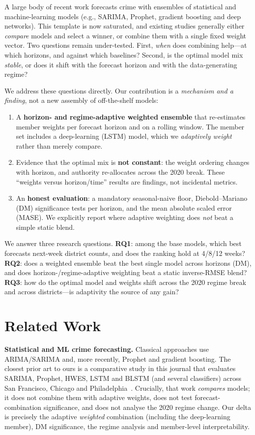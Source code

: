 \documentclass[11pt]{article}
\begin{document}
A large body of recent work forecasts crime with ensembles of statistical and machine-learning
models (e.g., SARIMA, Prophet, gradient boosting and deep networks). This template is now
saturated, and existing studies generally either \emph{compare} models and select a winner, or
combine them with a single fixed weight vector. Two questions remain under-tested. First,
\emph{when} does combining help---at which horizons, and against which baselines? Second, is the
optimal model mix \emph{stable}, or does it shift with the forecast horizon and with the
data-generating regime?

We address these questions directly. Our contribution is a \emph{mechanism and a finding}, not a
new assembly of off-the-shelf models:
\begin{enumerate}
  \item A \textbf{horizon- and regime-adaptive weighted ensemble} that re-estimates member
  weights per forecast horizon and on a rolling window. The member set includes a deep-learning
  (LSTM) model, which we \emph{adaptively weight} rather than merely compare.
  \item Evidence that the optimal mix is \textbf{not constant}: the weight ordering changes with
  horizon, and authority re-allocates across the 2020 break. These ``weights versus horizon/time''
  results are findings, not incidental metrics.
  \item An \textbf{honest evaluation}: a mandatory seasonal-naive floor, Diebold--Mariano (DM)
  significance tests per horizon, and the mean absolute scaled error (MASE). We explicitly report
  where adaptive weighting does \emph{not} beat a simple static blend.
\end{enumerate}

We answer three research questions. \textbf{RQ1}: among the base models, which best forecasts
next-week district counts, and does the ranking hold at 4/8/12 weeks? \textbf{RQ2}: does a
weighted ensemble beat the best single model across horizons (DM), and does horizon-/regime-adaptive
weighting beat a static inverse-RMSE blend? \textbf{RQ3}: how do the optimal model and weights shift
across the 2020 regime break and across districts---is adaptivity the source of any gain?

\section{Related Work}
\textbf{Statistical and ML crime forecasting.} Classical approaches use ARIMA/SARIMA and, more
recently, Prophet and gradient boosting. The closest prior art to ours is a comparative study in
this journal that evaluates SARIMA, Prophet, HWES, LSTM and BLSTM (and several classifiers) across
San Francisco, Chicago and Philadelphia~\cite{ncaa2025}. Crucially, that work \emph{compares}
models; it does not combine them with adaptive weights, does not test forecast-combination
significance, and does not analyse the 2020 regime change. Our delta is precisely the adaptive
\emph{weighted} combination (including the deep-learning member), DM significance, the regime
analysis and member-level interpretability.
\end{document}
